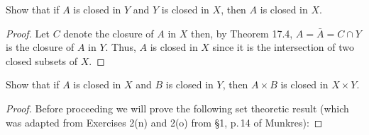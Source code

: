 \begin{problem}[Munkres \S17, p.\,100, 2]
Show that if $A$ is closed in $Y$ and $Y$ is closed in $X$, then
$A$ is closed in $X$.
\end{problem}
\begin{proof}
Let $C$ denote the closure of $A$ in $X$ then, by Theorem 17.4,
$A=\bar A=C\cap Y$ is the closure of $A$ in $Y$. Thus, $A$ is
closed in $X$ since it is the intersection of two closed subsets
of $X$.
\end{proof}
\newpage
\begin{problem}[Munkres \S17, p.\,100, 3]
Show that if $A$ is closed in $X$ and $B$ is closed in $Y$, then
$A\times B$ is closed in $X\times Y$.
\end{problem}
\begin{proof}
Before proceeding we will prove the following set theoretic
result (which was adapted from Exercises 2(n) and 2(o) from \S1,
p.\,14 of Munkres):


\end{proof}
